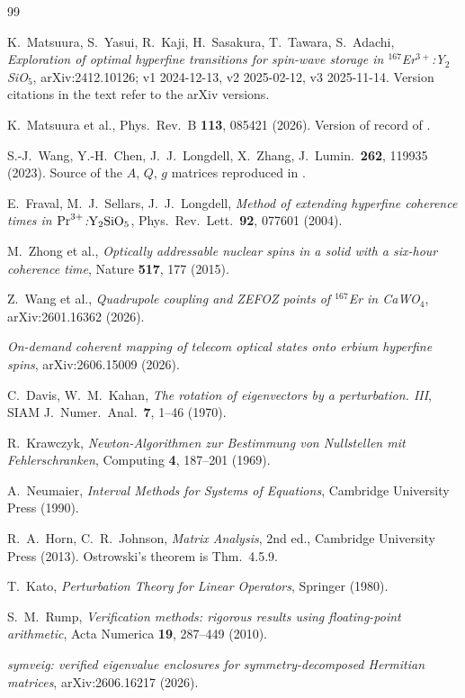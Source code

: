 \documentclass[11pt]{amsart}
\theoremstyle{plain}
\theoremstyle{definition}
\theoremstyle{remark}
\begin{document}
\begin{thebibliography}{99}

 K.~Matsuura, S.~Yasui, R.~Kaji, H.~Sasakura, T.~Tawara,
S.~Adachi, \emph{Exploration of optimal hyperfine transitions for spin-wave
storage in $^{167}$Er$^{3+}$:Y$_2$SiO$_5$}, arXiv:2412.10126; v1 2024-12-13,
v2 2025-02-12, v3 2025-11-14.  Version citations in the text refer to the
arXiv versions.

 K.~Matsuura et al., Phys.\ Rev.\ B \textbf{113}, 085421
(2026).  Version of record of \cite{Matsuura}.

 S.-J.~Wang, Y.-H.~Chen, J.~J.~Longdell, X.~Zhang,
J.~Lumin.\ \textbf{262}, 119935 (2023).  Source of the $A$, $Q$, $g$ matrices
reproduced in \cite[App.~B]{Matsuura}.

 E.~Fraval, M.~J.~Sellars, J.~J.~Longdell, \emph{Method of
extending hyperfine coherence times in ${\rm Pr}^{3+}$:${\rm Y_2SiO_5}$},
Phys.\ Rev.\ Lett.\ \textbf{92}, 077601 (2004).

 M.~Zhong et al., \emph{Optically addressable nuclear spins
in a solid with a six-hour coherence time}, Nature \textbf{517}, 177 (2015).

 Z.~Wang et al., \emph{Quadrupole coupling and ZEFOZ points
of $^{167}$Er in CaWO$_4$}, arXiv:2601.16362 (2026).

 \emph{On-demand coherent mapping of telecom optical
states onto erbium hyperfine spins}, arXiv:2606.15009 (2026).

 C.~Davis, W.~M.~Kahan, \emph{The rotation of eigenvectors
by a perturbation. III}, SIAM J.\ Numer.\ Anal.\ \textbf{7}, 1--46 (1970).

 R.~Krawczyk, \emph{Newton-Algorithmen zur Bestimmung von
Nullstellen mit Fehlerschranken}, Computing \textbf{4}, 187--201 (1969).

 A.~Neumaier, \emph{Interval Methods for Systems of
Equations}, Cambridge University Press (1990).

 R.~A.~Horn, C.~R.~Johnson, \emph{Matrix Analysis}, 2nd
ed., Cambridge University Press (2013).  Ostrowski's theorem is Thm.~4.5.9.

 T.~Kato, \emph{Perturbation Theory for Linear Operators},
Springer (1980).

 S.~M.~Rump, \emph{Verification methods: rigorous results using
floating-point arithmetic}, Acta Numerica \textbf{19}, 287--449 (2010).

 \emph{symveig: verified eigenvalue enclosures for
symmetry-decomposed Hermitian matrices}, arXiv:2606.16217 (2026).

\end{thebibliography}
\end{document}
